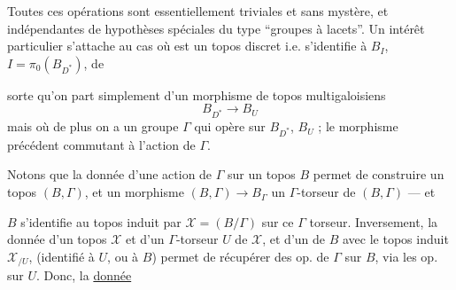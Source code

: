 
Toutes ces opérations sont essentiellement
triviales et sans mystère, et indépendantes de
 hypothèses spéciales du type ``groupes à
lacets''. Un intérêt particulier s'attache
au cas où  est un topos discret i.e.
s'identifie à $B_I$,  $I=\pi_0(B_{D^*})$, de

sorte qu'on part simplement d'un morphisme
de topos multigaloisiens
\[
 B_{D^*}\longrightarrow B_U
\]
mais où de plus on a un groupe $\Gamma$
qui opère sur $B_{D^*}$, $B_U$ ; le morphisme
précédent commutant à l'action de $\Gamma$.

Notons que la donnée d'une action
de $\Gamma$ sur un topos $B$ permet de
construire un topos $(B,\Gamma)$, et
un morphisme $(B,\Gamma)\longrightarrow B_\Gamma$
 un $\Gamma$-torseur de $(B,\Gamma)$ --- et

$B$ s'identifie au topos induit par
$\mathcal X=(B/\Gamma)$ sur ce $\Gamma$ torseur. Inversement,
la donnée d'un topos $\mathcal X$ et d'un
$\Gamma$-torseur $U$ de $\mathcal X$, et d'un
 de $B$ avec le topos induit
$\mathcal X_{/U}$,  (identifié à $U$, ou à $B$) permet
de récupérer des op. de $\Gamma$ sur $B$,
via les op. sur $U$. Donc, la \uline{donnée}

